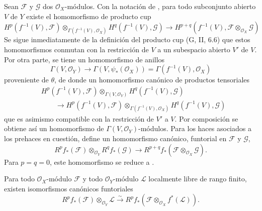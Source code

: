 \begin{env}[12.2.2]
\label{0.12.2.2}
\label{0.12.2.2-fr}
Sean $\mathcal F$ y $\mathcal G$ dos $\mathcal O_X$-módulos.
Con la notación de , para todo subconjunto abierto $V$ de
$Y$ existe el homomorfismo de producto cup 
\[
H^p(f^{-1}(V),\mathcal F)
\otimes_{\Gamma(f^{-1}(V),\mathcal O_X)}
H^q(f^{-1}(V),\mathcal G)
\longrightarrow
H^{p+q}(f^{-1}(V),\mathcal F\otimes_{\mathcal O_X}\mathcal G)
\]
Se sigue inmediatamente de la definición del producto cup
(G, II, 6.6) que estos homomorfismos conmutan con la restricción de
$V$ a un subespacio abierto $V'$ de $V$. Por otra parte, se tiene un homomorfismo de anillos
\[
\Gamma(V,\mathcal O_Y)\longrightarrow\Gamma(V,\psi_*(\mathcal O_X))
=\Gamma(f^{-1}(V),\mathcal O_X)
\]
proveniente de $\theta$, de donde un homomorfismo canónico de productos tensoriales
\[
\begin{aligned}
&H^p(f^{-1}(V),\mathcal F)\otimes_{\Gamma(V,\mathcal O_Y)}
H^q(f^{-1}(V),\mathcal G)\\
&\qquad\longrightarrow
H^p(f^{-1}(V),\mathcal F)
\otimes_{\Gamma(f^{-1}(V),\mathcal O_X)}
H^q(f^{-1}(V),\mathcal G)
\end{aligned}
\]
que es asimismo compatible con la restricción de $V'$ a $V$.
Por composición se obtiene así un homomorfismo de
$\Gamma(V,\mathcal O_Y)$-módulos.  Para los haces asociados a los
prehaces en cuestión, define un homomorfismo canónico,
funtorial en $\mathcal F$ y $\mathcal G$,
\[
\label{0.12.2.2.1-fr}
\tag{12.2.2.1}
R^p f_*(\mathcal F)\otimes_{\mathcal O_Y}R^q f_*(\mathcal G)
\longrightarrow
R^{p+q}f_*(\mathcal F\otimes_{\mathcal O_X}\mathcal G).
\]
Para $p=q=0$, este homomorfismo se reduce a
.
\end{env}

\begin{proposition}[12.2.3]
\label{0.12.2.3}
\label{0.12.2.3-fr}
Para todo $\mathcal O_X$-módulo $\mathcal F$ y todo $\mathcal O_Y$-módulo
$\mathcal L$ localmente libre de rango finito, existen isomorfismos canónicos
funtoriales
\[
\label{0.12.2.3.1-fr}
\tag{12.2.3.1}
R^p f_*(\mathcal F)\otimes_{\mathcal O_Y}\mathcal L
\xrightarrow{\sim}
R^p f_*(\mathcal F\otimes_{\mathcal O_X}f^*(\mathcal L)).
\]
\end{proposition}

